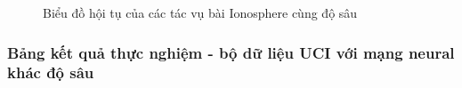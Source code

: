 \begin{figure}[h!]
    \centering
    \caption{Biểu đồ hội tụ của các tác vụ bài Ionosphere cùng độ sâu}
    \label{fig:br_mtl}
\end{figure}
\newpage
\subsubsection{Bảng kết quả thực nghiệm - bộ dữ liệu UCI với mạng neural khác độ sâu}
    
